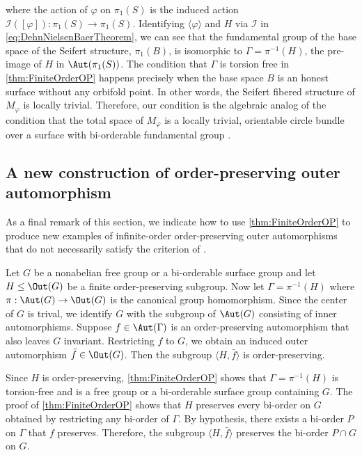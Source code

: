 \documentclass{amsart}
\makeatletter
\renewenvironment{proof}[1][\proofname]{%
   \par\pushQED{\qed}\normalfont%
   \topsep6\p@\@plus6\p@\relax
   \trivlist\item[\hskip\labelsep\bfseries#1\@addpunct{.}]%
   \ignorespaces
}{%
   \popQED\endtrivlist\@endpefalse
}
\makeatother
\begin{document}
where the action of $\varphi$ on $\pi_1(S)$ is the induced action $\mathcal{I}([\varphi]):\pi_1(S)\to\pi_1(S)$. Identifying $\langle \varphi \rangle$ and $H$ via $\mathcal{I}$ in \cref{eq:DehnNielsenBaerTheorem}, we can see that the fundamental group of the base space of the Seifert structure, $\pi_1(B)$, is isomorphic to $\Gamma = \pi^{-1}(H)$, the pre-image of $H$ in $\Aut(\pi_1(S))$. The condition that $\Gamma$ is torsion free in \cref{thm:FiniteOrderOP} happens precisely when the base space $B$ is an honest surface without any orbifold point. In other words, the Seifert fibered structure of $M_\varphi$ is locally trivial. Therefore, our condition is the algebraic analog of the condition that the total space of $M_\varphi$ is a locally trivial, orientable circle bundle over a surface with bi-orderable fundamental group \cite[Theorem 1.5]{BoyerRolfsenWiest05}.  

\subsection{A new construction of order-preserving outer automorphism}

As a final remark of this section, we indicate how to use \cref{thm:FiniteOrderOP} to produce new examples of infinite-order order-preserving outer automorphisms that do not necessarily satisfy the criterion of \cite[Theorem 2.6]{PerronRolfsen03}.  



\begin{cor}\label{cor:OPOuterAutomorphismCommutingWithFiniteOrder}
    Let $G$ be a nonabelian free group or a bi-orderable surface group and let $H\leq\Out(G)$ be a finite order-preserving subgroup. Now let $\Gamma = \pi^{-1}(H)$ where $\pi:\Aut(G) \to \Out(G)$ is the canonical group homomorphism. Since the center of $G$ is trival, we identify $G$ with the subgroup of $\Aut(G)$ consisting of inner automorphisms. Suppose $f \in \Aut(\Gamma)$ is an order-preserving automorphism that also leaves $G$ invariant. Restricting $f$ to $G$, we obtain an induced outer automorphism $\bar{f} \in \Out(G)$. Then the subgroup $\langle H, \bar{f}\rangle$ is order-preserving. 
\end{cor}

\begin{proof}
    Since $H$ is order-preserving, \cref{thm:FiniteOrderOP} shows that $\Gamma = \pi^{-1}(H)$ is torsion-free and is a free group or a bi-orderable surface group containing $G$. The proof of \cref{thm:FiniteOrderOP} shows that $H$ preserves every bi-order on $G$ obtained by restricting any bi-order of $\Gamma$. By hypothesis, there exists a bi-order $P$ on $\Gamma$ that $f$ preserves. Therefore, the subgroup $\langle H, \bar{f}\rangle$ preserves the bi-order $P\cap G$ on $G$. 
\end{proof}
\end{document}
